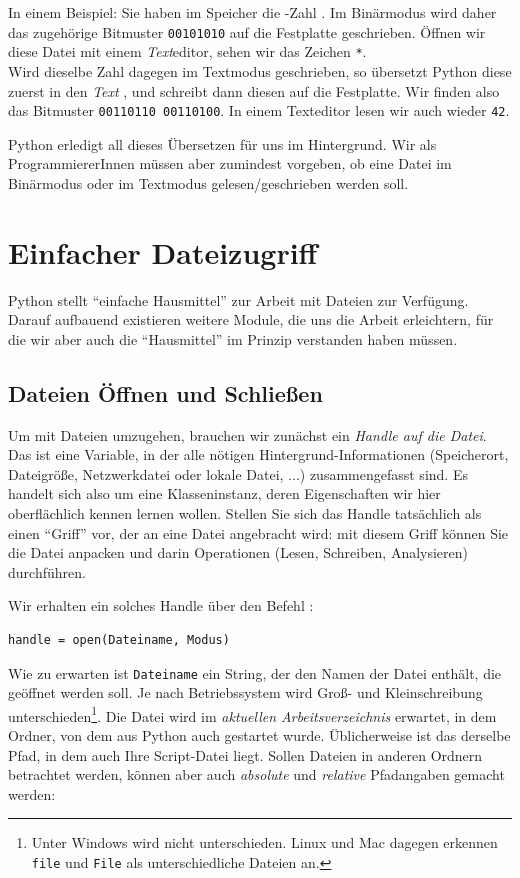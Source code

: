 In einem Beispiel: Sie haben im Speicher die -Zahl . Im Binärmodus wird daher das zugehörige Bitmuster \texttt{00101010} auf die Festplatte geschrieben. Öffnen wir diese Datei mit einem \emph{Text}editor, sehen wir das Zeichen \texttt{*}.\\
Wird dieselbe Zahl  dagegen im Textmodus geschrieben, so übersetzt Python diese zuerst in den \emph{Text} , und schreibt dann diesen auf die Festplatte. Wir finden also das Bitmuster \texttt{00110110 00110100}. In einem Texteditor lesen wir auch wieder \texttt{42}.

Python erledigt all dieses Übersetzen für uns im Hintergrund. Wir als ProgrammiererInnen müssen aber zumindest vorgeben, ob eine Datei im Binärmodus oder im Textmodus gelesen/geschrieben werden soll.

\section{Einfacher Dateizugriff}
Python stellt \enquote{einfache Hausmittel} zur Arbeit mit Dateien zur Verfügung. Darauf aufbauend existieren weitere Module, die uns die Arbeit erleichtern, für die wir aber auch die \enquote{Hausmittel} im Prinzip verstanden haben müssen. 

\subsection{Dateien Öffnen und Schließen}
Um mit Dateien umzugehen, brauchen wir zunächst ein \emph{Handle auf die Datei}. Das ist eine Variable, in der alle nötigen Hintergrund-Informationen (Speicherort, Dateigröße, Netzwerkdatei oder lokale Datei, ...) zusammengefasst sind. Es handelt sich also um eine Klasseninstanz, deren Eigenschaften wir hier oberflächlich kennen lernen wollen. Stellen Sie sich das Handle tatsächlich als einen \enquote{Griff} vor, der an eine Datei angebracht wird: mit diesem Griff können Sie die Datei anpacken und darin Operationen (Lesen, Schreiben, Analysieren) durchführen.

Wir erhalten ein solches Handle über den Befehl :
\begin{codebox}
\begin{verbatim}
handle = open(Dateiname, Modus)
\end{verbatim}
\end{codebox}

Wie zu erwarten ist \texttt{Dateiname} ein String, der den Namen der Datei enthält, die geöffnet werden soll. Je nach Betriebssystem wird Groß- und Kleinschreibung unterschieden\footnote{Unter Windows wird nicht unterschieden. Linux und Mac dagegen erkennen \texttt{file} und \texttt{File} als unterschiedliche Dateien an.}. Die Datei wird im \emph{aktuellen Arbeitsverzeichnis} erwartet, \ie in dem Ordner, von dem aus Python auch gestartet wurde. Üblicherweise ist das derselbe Pfad, in dem auch Ihre Script-Datei liegt. Sollen Dateien in anderen Ordnern betrachtet werden, können aber auch \emph{absolute} und \emph{relative} Pfadangaben gemacht werden:

